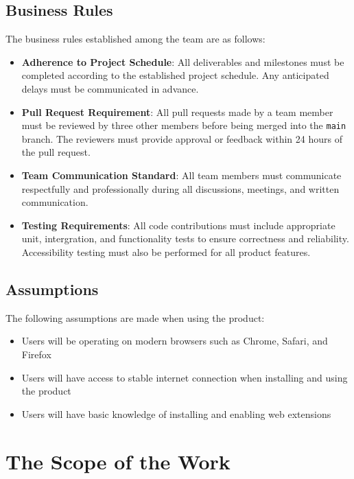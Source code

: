 \documentclass[12pt]{article}
\begin{document}
\subsection{Business Rules}
The business rules established among the team are as follows: 
\begin{itemize}
  \item \textbf{Adherence to Project Schedule}: All deliverables and milestones must be 
  completed according to the established project schedule. Any anticipated delays must be communicated
  in advance.
  \item \textbf{Pull Request Requirement}: All pull requests made by a team member must be reviewed by 
  three other members before being merged into the \texttt{main} branch. The reviewers must provide approval
  or feedback within 24 hours of the pull request.
  \item \textbf{Team Communication Standard}: All team members must communicate respectfully and professionally during 
  all discussions, meetings, and written communication. 
  \item \textbf{Testing Requirements}: All code contributions must include appropriate unit, intergration, and 
  functionality tests to ensure correctness and reliability. Accessibility testing must also be performed for all
  product features. 
\end{itemize}
\subsection{Assumptions}
The following assumptions are made when using the product:
\begin{itemize}
  \item Users will be operating on modern browsers such as Chrome, Safari, and Firefox
  \item Users will have access to stable internet connection when installing and using the product
  \item Users will have basic knowledge of installing and enabling web extensions
\end{itemize}
\section{The Scope of the Work}
\end{document}
